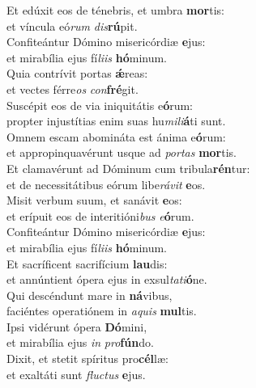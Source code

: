 \evenverse Et edúxit eos de ténebris, et umbra \textbf{mor}tis:~\*\\
\evenverse et víncula eó\textit{rum} \textit{dis}\textbf{rú}pit.\\
\oddverse Confiteántur Dómino misericórdiæ \textbf{e}jus:~\*\\
\oddverse et mirabília ejus fí\textit{li}\textit{is} \textbf{hó}minum.\\
\evenverse Quia contrívit portas \textbf{ǽ}reas:~\*\\
\evenverse et vectes férre\textit{os} \textit{con}\textbf{fré}git.\\
\oddverse Suscépit eos de via iniquitátis e\textbf{ó}rum:~\*\\
\oddverse propter injustítias enim suas hu\textit{mi}\textit{li}\textbf{á}ti sunt.\\
\evenverse Omnem escam abomináta est ánima e\textbf{ó}rum:~\*\\
\evenverse et appropinquavérunt usque ad \textit{por}\textit{tas} \textbf{mor}tis.\\
\oddverse Et clamavérunt ad Dóminum cum tribula\textbf{rén}tur:~\*\\
\oddverse et de necessitátibus eórum libe\textit{rá}\textit{vit} \textbf{e}os.\\
\evenverse Misit verbum suum, et sanávit \textbf{e}os:~\*\\
\evenverse et erípuit eos de interitióni\textit{bus} \textit{e}\textbf{ó}rum.\\
\oddverse Confiteántur Dómino misericórdiæ \textbf{e}jus:~\*\\
\oddverse et mirabília ejus fí\textit{li}\textit{is} \textbf{hó}minum.\\
\evenverse Et sacríficent sacrifícium \textbf{lau}dis:~\*\\
\evenverse et annúntient ópera ejus in exsul\textit{ta}\textit{ti}\textbf{ó}ne.\\
\oddverse Qui descéndunt mare in \textbf{ná}vibus,~\*\\
\oddverse faciéntes operatiónem in \textit{a}\textit{quis} \textbf{mul}tis.\\
\evenverse Ipsi vidérunt ópera \textbf{Dó}mini,~\*\\
\evenverse et mirabília ejus \textit{in} \textit{pro}\textbf{fún}do.\\
\oddverse Dixit, et stetit spíritus pro\textbf{cél}læ:~\*\\
\oddverse et exaltáti sunt \textit{flu}\textit{ctus} \textbf{e}jus.\\
